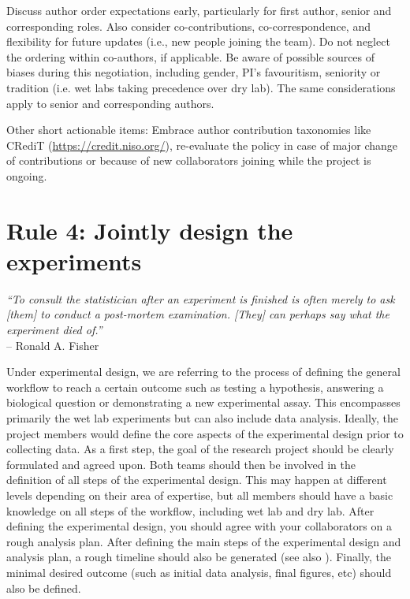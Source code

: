 \documentclass{article}
\begin{document}
Discuss author order expectations early, particularly for first author, senior and corresponding roles. Also consider co-contributions, co-correspondence, and flexibility for future updates (i.e., new people joining the team). Do not neglect the ordering within co-authors, if applicable. Be aware of possible sources of biases during this negotiation, including gender, PI’s favouritism, seniority or tradition (i.e. wet labs taking precedence over dry lab). The same considerations apply to senior and corresponding authors. 

Other short actionable items: Embrace author contribution taxonomies like CRediT \cite{allen2014publishing} (\url{https://credit.niso.org/}), re-evaluate the policy in case of major change of contributions or because of new collaborators joining while the project is ongoing.

\section*{Rule 4: Jointly design the experiments} %
\label{rule4_experiments}

\begin{flushright}
\rightskip=1cm\textit{``To consult the statistician after an experiment is finished is often merely to ask [them] to conduct a post-mortem examination. [They] can perhaps say what the experiment died of.''} \\
\vspace{.2em}
\rightskip=0cm -- Ronald A. Fisher
\end{flushright}

Under experimental design, we are referring to the process of defining the general workflow to reach a certain outcome such as testing a hypothesis, answering a biological question or demonstrating a new experimental assay. This encompasses primarily the wet lab experiments but can also include data analysis. Ideally, the project members would define the core aspects of the experimental design prior to collecting data. As a first step, the goal of the research project should be clearly formulated and agreed upon. Both teams should then be involved in the definition of all steps of the experimental design. This may happen at different levels depending on their area of expertise, but all members should have a basic knowledge on all steps of the workflow, including wet lab and dry lab. After defining the experimental design, you should agree with your collaborators on a rough analysis plan. After defining the main steps of the experimental design and analysis plan, a rough timeline should also be generated (see also ). Finally, the minimal desired outcome (such as initial data analysis, final figures, etc) should also be defined. 
\end{document}
